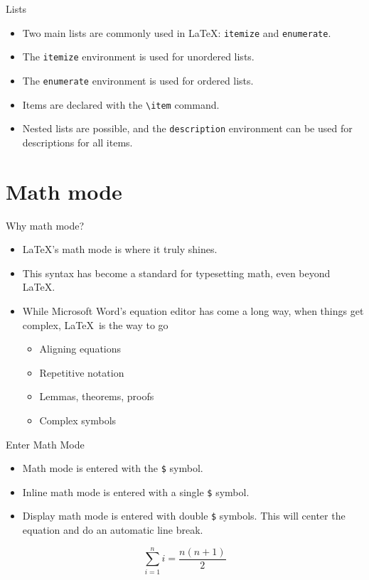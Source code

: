 \documentclass[t,12pt,xcolor=dvipsnames]{beamer}
\begin{document}
\begin{frame}{Lists}
    \begin{itemize}
        \item Two main lists are commonly used in \LaTeX: \texttt{itemize} and \texttt{enumerate}.
        \item The \texttt{itemize} environment is used for unordered lists.
        \item The \texttt{enumerate} environment is used for ordered lists.
        \item Items are declared with the \texttt{\textbackslash item} command.
        \item Nested lists are possible, and the \texttt{description} environment can be used for descriptions for all items.
    \end{itemize}
\end{frame}

\section{Math mode}

\begin{frame}{Why math mode?}
    \begin{itemize}
        \item \LaTeX's math mode is where it truly shines.
        \item This syntax has become a standard for typesetting math, even beyond \LaTeX.
        \item While Microsoft Word's equation editor has come a long way, when things get complex, \LaTeX \ is the way to go
        \begin{itemize}
            \item Aligning equations
            \item Repetitive notation
            \item Lemmas, theorems, proofs
            \item Complex symbols
        \end{itemize}
    \end{itemize}
\end{frame}

\begin{frame}{Enter Math Mode}
    \begin{itemize}
        \item Math mode is entered with the \texttt{\$} symbol.
        \item Inline math mode is entered with a single \texttt{\$} symbol.
        \item Display math mode is entered with double \texttt{\$} symbols. This will center the equation and do an automatic line break.
    \end{itemize}
            $$ \sum_{i=1}^{n} i = \frac{n(n+1)}{2} $$
\end{frame}
\end{document}
